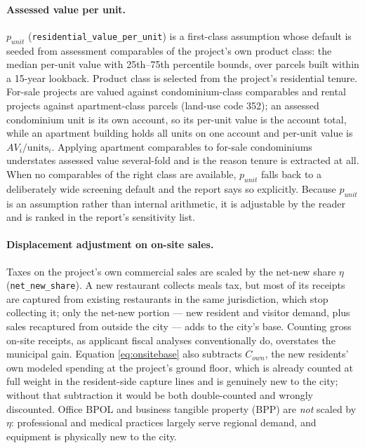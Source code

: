 \documentclass[11pt]{article}
\newcommand{\assum}[1]{\texttt{#1}}
\begin{document}
\paragraph{Assessed value per unit.}
$p_{unit}$ (\assum{residential\_value\_per\_unit}) is a first-class assumption
whose default is seeded from assessment comparables of the project's own
product class: the median per-unit value with 25th--75th percentile bounds,
over parcels built within a 15-year lookback. Product class is selected from
the project's residential tenure. For-sale projects are valued against
condominium-class comparables and rental projects against apartment-class
parcels (land-use code 352); an assessed condominium unit is its own account,
so its per-unit value is the account total, while an apartment building holds
all units on one account and per-unit value is $AV_i / \mathrm{units}_i$.
Applying apartment comparables to for-sale condominiums understates assessed
value several-fold and is the reason tenure is extracted at all. When no
comparables of the right class are available, $p_{unit}$ falls back to a
deliberately wide screening default and the report says so explicitly.
Because $p_{unit}$ is an assumption rather than internal arithmetic, it is
adjustable by the reader and is ranked in the report's sensitivity list.

\paragraph{Displacement adjustment on on-site sales.}
Taxes on the project's own commercial sales are scaled by the net-new share
$\eta$ (\assum{net\_new\_share}). A new restaurant collects meals tax, but
most of its receipts are captured from existing restaurants in the same
jurisdiction, which stop collecting it; only the net-new portion --- new
resident and visitor demand, plus sales recaptured from outside the city ---
adds to the city's base. Counting gross on-site receipts, as applicant fiscal
analyses conventionally do, overstates the municipal gain. Equation
\eqref{eq:onsitebase} also subtracts $C_{own}$, the new residents' own modeled
spending at the project's ground floor, which is already counted at full weight
in the resident-side capture lines and is genuinely new to the city; without
that subtraction it would be both double-counted and wrongly discounted.
Office BPOL and business tangible property (BPP) are \emph{not} scaled by
$\eta$: professional and medical practices largely serve regional demand, and
equipment is physically new to the city.
\end{document}
